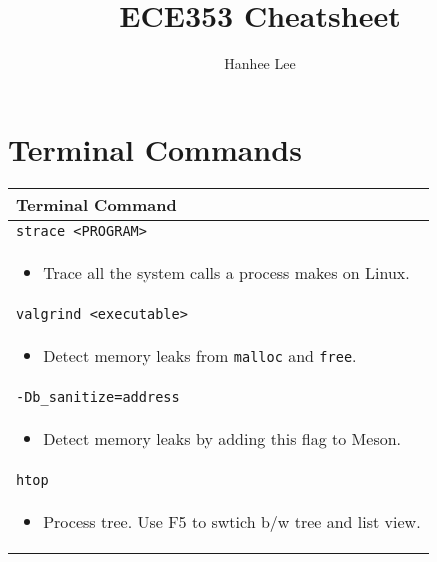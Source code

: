 \documentclass[twoside]{article}
\title{ECE353 Cheatsheet}
\author{Hanhee Lee}
\begin{document}
\section{Terminal Commands}
\begin{summary}
    \begin{center}
        \begin{tabular}{l}
        \toprule
        \textbf{Terminal Command} \\
        \midrule
        \texttt{strace <PROGRAM>} \\
        \multicolumn{1}{p{\linewidth}}{
        \begin{itemize}
            \item Trace all the system calls a process makes on Linux. 
        \end{itemize}} \\
        \midrule
        \texttt{valgrind <executable>} \\
        \multicolumn{1}{p{\linewidth}}{
        \begin{itemize}
            \item Detect memory leaks from \texttt{malloc} and \texttt{free}.
        \end{itemize}} \\
        \midrule
        \texttt{-Db\_sanitize=address} \\
        \multicolumn{1}{p{\linewidth}}{
        \begin{itemize}
            \item Detect memory leaks by adding this flag to Meson.
        \end{itemize}} \\
        \midrule
        \texttt{htop} \\
        \multicolumn{1}{p{\linewidth}}{
        \begin{itemize}
            \item Process tree. Use F5 to swtich b/w tree and list view.
        \end{itemize}} \\
        \bottomrule
        \end{tabular}
    \end{center}
\end{summary}
\newpage
\end{document}
